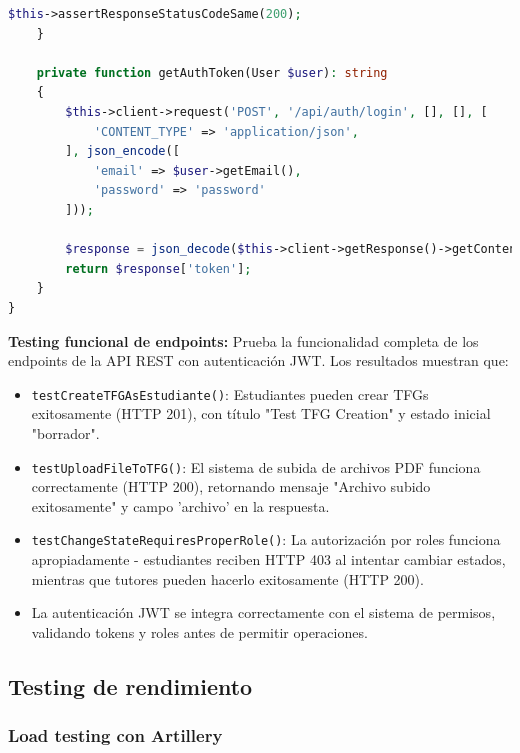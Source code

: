 \documentclass[12pt,a4paper,oneside]{report}
\begin{document}
\begin{lstlisting}[language=PHP]
        $this->assertResponseStatusCodeSame(200);
    }

    private function getAuthToken(User $user): string
    {
        $this->client->request('POST', '/api/auth/login', [], [], [
            'CONTENT_TYPE' => 'application/json',
        ], json_encode([
            'email' => $user->getEmail(),
            'password' => 'password'
        ]));

        $response = json_decode($this->client->getResponse()->getContent(), true);
        return $response['token'];
    }
}
\end{lstlisting}

\textbf{Testing funcional de endpoints:} Prueba la funcionalidad completa de los endpoints de la API REST con autenticación JWT. Los resultados muestran que:
\begin{itemize}
\item \texttt{testCreateTFGAsEstudiante()}: Estudiantes pueden crear TFGs exitosamente (HTTP 201), con título "Test TFG Creation" y estado inicial "borrador".
\item \texttt{testUploadFileToTFG()}: El sistema de subida de archivos PDF funciona correctamente (HTTP 200), retornando mensaje "Archivo subido exitosamente" y campo 'archivo' en la respuesta.
\item \texttt{testChangeStateRequiresProperRole()}: La autorización por roles funciona apropiadamente - estudiantes reciben HTTP 403 al intentar cambiar estados, mientras que tutores pueden hacerlo exitosamente (HTTP 200).
\item La autenticación JWT se integra correctamente con el sistema de permisos, validando tokens y roles antes de permitir operaciones.
\end{itemize}

\subsection{Testing de rendimiento}\label{testing-de-rendimiento}

\subsubsection{Load testing con
Artillery}\label{load-testing-con-artillery}
\end{document}

